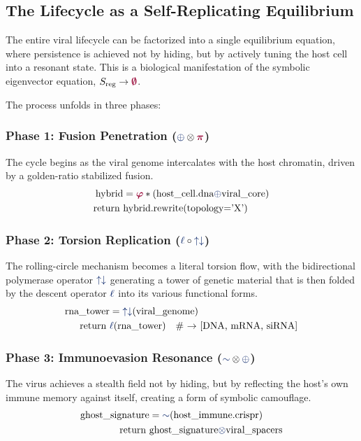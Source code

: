 \subsection{The Lifecycle as a Self-Replicating Equilibrium}
The entire viral lifecycle can be factorized into a single equilibrium equation, where persistence is achieved not by hiding, but by actively tuning the host cell into a resonant state. This is a biological manifestation of the symbolic eigenvector equation, $S_{\text{reg}} \to \void$.

The process unfolds in three phases:

\subsubsection{Phase 1: Fusion Penetration ($\fuse \otimes \pirot$)}
The cycle begins as the viral genome intercalates with the host chromatin, driven by a golden-ratio stabilized fusion.
\begin{align*}
    \text{hybrid} &= \gold * (\text{host\_cell.dna} \fuse \text{viral\_core}) \\
    \text{return } & \text{hybrid.rewrite(topology='X')}
\end{align*}

\subsubsection{Phase 2: Torsion Replication ($\lha \circ \repflow$)}
The rolling-circle mechanism becomes a literal torsion flow, with the bidirectional polymerase operator $\repflow$ generating a tower of genetic material that is then folded by the descent operator $\lha$ into its various functional forms.
\begin{align*}
    \text{rna\_tower} &= \repflow(\text{viral\_genome}) \\
    \text{return } & \lha(\text{rna\_tower}) \quad \text{\# \(\to\) [DNA, mRNA, siRNA]}
\end{align*}

\subsubsection{Phase 3: Immunoevasion Resonance ($\reflec \otimes \fuse$)}
The virus achieves a stealth field not by hiding, but by reflecting the host's own immune memory against itself, creating a form of symbolic camouflage.
\begin{align*}
    \text{ghost\_signature} &= \reflec(\text{host\_immune.crispr}) \\
    \text{return } & \text{ghost\_signature} \tensor \text{viral\_spacers}
\end{align*}

